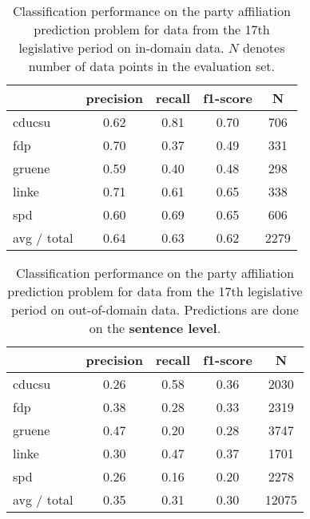 \documentclass[11pt]{article}
\begin{document}
\begin{table}[t]
\caption{
\label{tab:results_in-domain}
Classification performance on the party affiliation prediction problem for data from the 17th legislative period on in-domain data. $N$ denotes number of data points in the evaluation set.
}
\begin{center}
\begin{tabular}{lcccc}
    &         precision    &recall &  f1-score  & N  \\
\hline \hline
       cducsu   &    0.62  &    0.81  &    0.70  &     706\\
        fdp    &   0.70   &   0.37  &    0.49    &   331\\
     gruene &      0.59  &    0.40   &   0.48   &    298\\
      linke    &   0.71   &   0.61  &    0.65    &   338\\
        spd   &    0.60   &   0.69  &    0.65   &    606\\
\hline
avg / total &      0.64   &   0.63   &   0.62    &  2279 
%
\end{tabular}
\end{center}
\end{table}

\begin{table}[t]
\caption{
\label{tab:results_out-of-domain}
Classification performance on the party affiliation prediction problem for data from the 17th legislative period on out-of-domain data.  Predictions are done on the {\bf sentence level}.\label{tab:confusion}
}
\begin{center}
\begin{tabular}{lcccc}
    &         precision    &recall &  f1-score  & N  \\
\hline \hline
    cducsu    &   0.26   &   0.58   &   0.36    &   2030 \\
    fdp    &   0.38   &   0.28   &   0.33    &   2319 \\
     gruene   &    0.47    &  0.20   &   0.28    &  3747\\
      linke     &  0.30  &    0.47    &  0.37    &   1701\\
        spd     &  0.26  &    0.16   &   0.20    &   2278\\
\hline
avg / total    &   0.35  &    0.31  &    0.30   &   12075\\
%
\end{tabular}
\end{center}

\end{table}
\end{document}
